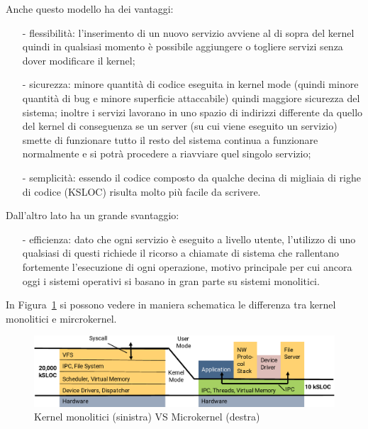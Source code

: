 Anche questo modello ha dei vantaggi:
\begin{itemize}
	\item[-] flessibilità: l'inserimento di un nuovo servizio avviene al di sopra del kernel quindi in qualsiasi momento è possibile aggiungere o togliere servizi senza dover modificare il kernel;
	\item[-] sicurezza: minore quantità di codice eseguita in kernel mode (quindi minore quantità di bug e minore superficie attaccabile) quindi maggiore sicurezza del sistema; inoltre i servizi lavorano in uno spazio di indirizzi differente da quello del kernel di conseguenza se un server (su cui viene eseguito un servizio) smette di funzionare tutto il resto del sistema continua a funzionare normalmente e si potrà procedere a riavviare quel singolo servizio;
	\item[-] semplicità: essendo il codice composto da qualche decina di migliaia di righe di codice (KSLOC) risulta molto più facile da scrivere.
\end{itemize}
Dall'altro lato ha un grande svantaggio:
\begin{itemize}
	\item[-] efficienza: dato che ogni servizio è eseguito a livello utente, l'utilizzo di uno qualsiasi di questi richiede il ricorso a chiamate di sistema che rallentano fortemente l'esecuzione di ogni operazione, motivo principale per cui ancora oggi i sistemi operativi si basano in gran parte su sistemi monolitici.
\end{itemize}
In Figura~\ref{fig:MonolithicVSmicrokernel} si possono vedere in maniera schematica le differenza tra kernel monolitici e mircrokernel.

\begin{figure}[h]
  \includegraphics[width=\linewidth]{img/MonolithicVSmicrokernel.png}
  \caption{Kernel monolitici (sinistra) VS Microkernel (destra)}
  \label{fig:MonolithicVSmicrokernel}
\end{figure}
\newpage

